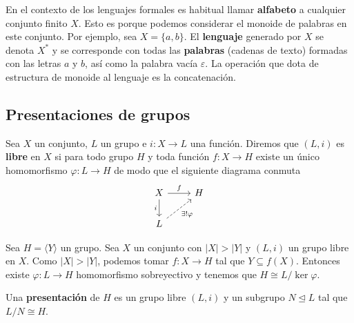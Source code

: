 \documentclass[bibtex, anon]{TEMat-article}
\providecommand{\gene}[1]{\langle{#1}\rangle}
\begin{document}
\begin{ejemplo}
	En el contexto de los lenguajes formales es habitual llamar \textbf{alfabeto} a cualquier conjunto finito $X$. Esto es porque podemos considerar el monoide de palabras en este conjunto. Por ejemplo, sea $X=\{a,b\}$. El \textbf{lenguaje} generado por $X$ se denota $X^*$ y se corresponde con todas las \textbf{palabras} (cadenas de texto) formadas con las letras $a$ y $b$, así como la palabra vacía $\varepsilon$. La operación que dota de estructura de monoide al lenguaje es la concatenación. 
	\end{ejemplo}


\subsection{Presentaciones de grupos}
\begin{definicion}
	Sea $X$ un conjunto, $L$ un grupo e $i:X\to L$ una función. Diremos que $(L,i)$ es \textbf{libre} en $X$ si para todo grupo $H$ y toda función $f:X\to H$ existe un único homomorfismo $\varphi:L\to H$ de modo que el siguiente diagrama conmuta
	\[
	\begin{tikzcd}
	X\arrow[r, "f"]\arrow[d,"i"'] & H\\
	L\arrow[ur, dashed, "\exists!\varphi"']
	\end{tikzcd}
	\]
\end{definicion}

\begin{observacion}\label{4.2}
	Sea $H=\gene{Y}$ un grupo. Sea $X$ un conjunto con $|X|>|Y|$ y $(L,i)$ un grupo libre en $X$. Como $|X|>|Y|$, podemos tomar $f:X\to H$ tal que $Y\subseteq f(X)$. Entonces existe $\varphi:L\to H$ homomorfismo sobreyectivo y tenemos que $H\cong L/\ker\varphi$.
\end{observacion}

\begin{definicion}
	Una \textbf{presentación} de $H$ es un grupo libre $(L,i)$ y un subgrupo $N\trianglelefteq L$ tal que $L/N\cong H$. 
\end{definicion}
\end{document}
